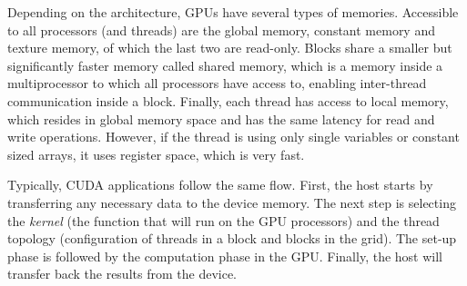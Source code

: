 
Depending on the architecture, GPUs have several types of memories.
Accessible to all processors (and threads) are the global memory, constant memory and texture memory, of which the last two are read-only.
Blocks share a smaller but significantly faster memory called shared memory, which is a memory inside a multiprocessor to which all processors have access to, enabling inter-thread communication inside a block.
Finally, each thread has access to local memory, which resides in global memory space and has the same latency for read and write operations.
However, if the thread is using only single variables or constant sized arrays, it uses register space, which is very fast.

Typically, CUDA applications follow the same flow.
First, the host starts by transferring any necessary data to the device memory.
The next step is selecting the \emph{kernel} (the function that will run on the GPU processors) and the thread topology (configuration of threads in a block and blocks in the grid).
The set-up phase is followed by the computation phase in the GPU.
Finally, the host will transfer back the results from the device.
